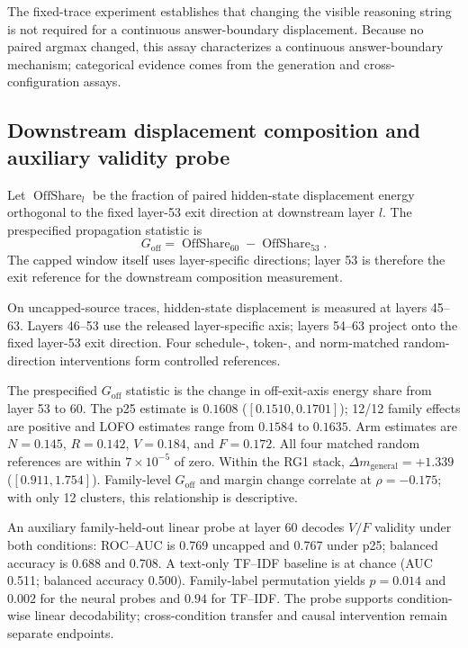 \documentclass[letterpaper]{article}
\begin{document}
The fixed-trace experiment establishes that changing the visible reasoning string is not required for a continuous answer-boundary displacement.  Because no paired argmax changed, this assay characterizes a continuous answer-boundary mechanism; categorical evidence comes from the generation and cross-configuration assays.

\subsection{Downstream displacement composition and auxiliary validity probe}

Let $\operatorname{OffShare}_l$ be the fraction of paired hidden-state displacement energy orthogonal to the fixed layer-53 exit direction at downstream layer $l$.  The prespecified propagation statistic is
\begin{equation}
G_{\mathrm{off}}=\operatorname{OffShare}_{60}-\operatorname{OffShare}_{53}.
\end{equation}
The capped window itself uses layer-specific directions; layer 53 is therefore the exit reference for the downstream composition measurement.

On uncapped-source traces, hidden-state displacement is measured at layers 45--63.  Layers 46--53 use the released layer-specific axis; layers 54--63 project onto the fixed layer-53 exit direction.  Four schedule-, token-, and norm-matched random-direction interventions form controlled references.

The prespecified $G_{\mathrm{off}}$ statistic is the change in off-exit-axis energy share from layer 53 to 60.  The p25 estimate is $0.1608$ ($[0.1510,0.1701]$); 12/12 family effects are positive and LOFO estimates range from $0.1584$ to $0.1635$.  Arm estimates are $N=0.145$, $R=0.142$, $V=0.184$, and $F=0.172$.  All four matched random references are within $7\times10^{-5}$ of zero.  Within the RG1 stack, $\Delta m_{\mathrm{general}}=+1.339$ ($[0.911,1.754]$).  Family-level $G_{\mathrm{off}}$ and margin change correlate at $\rho=-0.175$; with only 12 clusters, this relationship is descriptive.

An auxiliary family-held-out linear probe at layer 60 decodes $V/F$ validity under both conditions: ROC--AUC is 0.769 uncapped and 0.767 under p25; balanced accuracy is 0.688 and 0.708.  A text-only TF--IDF baseline is at chance (AUC 0.511; balanced accuracy 0.500).  Family-label permutation yields $p=0.014$ and $0.002$ for the neural probes and $0.94$ for TF--IDF.  The probe supports condition-wise linear decodability; cross-condition transfer and causal intervention remain separate endpoints.
\end{document}
